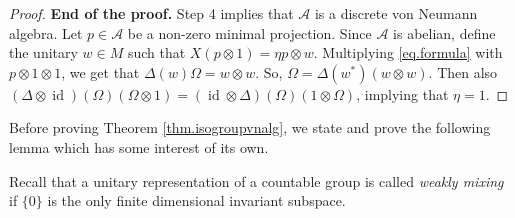\documentclass[a4paper,11pt]{amsart}
\numberwithin{equation}{section}
\begin{document}
\begin{proof}
{\bf End of the proof.} Step 4 implies that ${\mathcal{A}}$ is a discrete von Neumann algebra. Let $p \in {\mathcal{A}}$ be a non-zero minimal projection. Since ${\mathcal{A}}$ is abelian, define the unitary $w \in M$ such that $X(p {\otimes} 1) = \eta p {\otimes} w$. Multiplying \eqref{eq.formula} with $p {\otimes} 1 {\otimes} 1$, we get that ${\Delta}(w) \Omega = w {\otimes} w$. So, ${\Omega} = {\Delta}(w^*) (w {\otimes} w)$. Then also $({\Delta} {\otimes} {\mathord{\operatorname{id}}})({\Omega})({\Omega} {\otimes} 1) = ({\mathord{\operatorname{id}}} {\otimes} {\Delta})({\Omega})(1 {\otimes} {\Omega})$, implying that $\eta = 1$.
\end{proof}

Before proving Theorem \ref{thm.isogroupvnalg}, we state and prove the following lemma which has some interest of its own.

Recall that a unitary representation of a countable group is called \emph{weakly mixing} if $\{0\}$ is the only finite dimensional invariant subspace.
\end{document}
